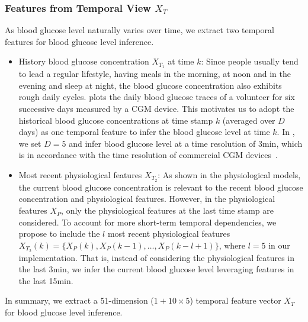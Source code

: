 \subsubsection{Features from Temporal View $X_T$}
As blood glucose level naturally varies over time, we extract two temporal features for blood glucose level inference.
\begin{itemize}
  \item
  History blood glucose concentration $X_{T_1}$ at time $k$:
  Since people usually tend to lead a regular lifestyle, \eg having meals in the morning, at noon and in the evening and sleep at night, the blood glucose concentration also exhibits rough daily cycles.
   plots the daily blood glucose traces of a volunteer for six successive days measured by a CGM device.
  This motivates us to adopt the historical blood glucose concentrations at time stamp $k$ (averaged over $D$ days) as one temporal feature to infer the blood glucose level at time $k$.
  In \sysname, we set $D=5$ and infer blood glucose level at a time resolution of 3min, which is in accordance with the time resolution of commercial CGM devices~\cite{bib:CGM_wave}.
  \item
  Most recent physiological features $X_{T_2}$:
  As shown in the physiological models, the current blood glucose concentration is relevant to the recent blood glucose concentration and physiological features.
  However, in the physiological features $X_P$, only the physiological features at the last time stamp are considered.
  To account for more short-term temporal dependencies, we propose to include the $l$ most recent physiological features $X_{T_2}(k) = \{X_P(k), X_P(k-1), \ldots, X_P(k-l+1)\}$, where $l=5$ in our implementation.
  That is, instead of considering the physiological features in the last 3min, we infer the current blood glucose level leveraging features in the last 15min.
\end{itemize}
In summary, we extract a 51-dimension ($1+10\times 5$) temporal feature vector $X_T$ for blood glucose level inference.

